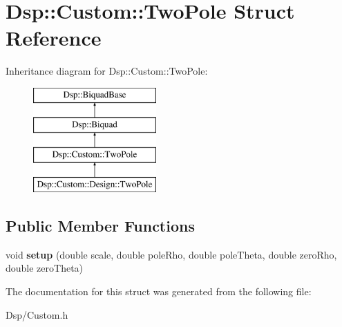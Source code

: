 \hypertarget{structDsp_1_1Custom_1_1TwoPole}{\section{Dsp\-:\-:Custom\-:\-:Two\-Pole Struct Reference}
\label{structDsp_1_1Custom_1_1TwoPole}
}
Inheritance diagram for Dsp\-:\-:Custom\-:\-:Two\-Pole\-:\begin{figure}[H]
\begin{center}
\leavevmode
\includegraphics[height=4.000000cm]{structDsp_1_1Custom_1_1TwoPole}
\end{center}
\end{figure}
\subsection*{Public Member Functions}
\begin{DoxyCompactItemize}
\item 
\hypertarget{structDsp_1_1Custom_1_1TwoPole_aff00e9b6715389160c9143853793ebea}{void {\bfseries setup} (double scale, double pole\-Rho, double pole\-Theta, double zero\-Rho, double zero\-Theta)}\label{structDsp_1_1Custom_1_1TwoPole_aff00e9b6715389160c9143853793ebea}

\end{DoxyCompactItemize}


The documentation for this struct was generated from the following file\-:\begin{DoxyCompactItemize}
\item 
Dsp/Custom.\-h\end{DoxyCompactItemize}
